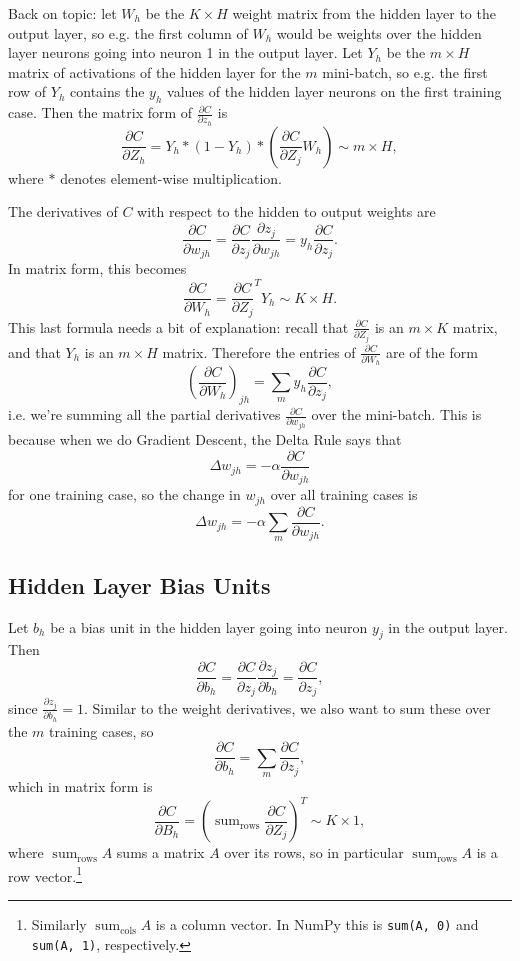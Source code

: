 \documentclass[12pt]{article}
\theoremstyle{plain}
\theoremstyle{definition}
\theoremstyle{remark}
\DeclareMathOperator*{\sumtext}{sum}
\begin{document}
Back on topic: let $W_h$ be the $K \times H$ weight matrix from the hidden layer to the output layer, so e.g. the first column of $W_h$ would be weights over the hidden layer neurons going into neuron 1 in the output layer. Let $Y_h$ be the $m\times H$ matrix of activations of the hidden layer for the $m$ mini-batch, so e.g. the first row of $Y_h$ contains the $y_h$ values of the hidden layer neurons on the first training case. Then the matrix form of $\frac{\partial C}{\partial z_h}$ is
$$\frac{\partial C}{\partial Z_h} = Y_h * (1 - Y_h) * \left(\frac{\partial C}{\partial Z_j}W_h\right) \sim m \times H,$$
where $*$ denotes element-wise multiplication.

The derivatives of $C$ with respect to the hidden to output weights are
$$\frac{\partial C}{\partial w_{jh}} = \frac{\partial C}{\partial z_j} \frac{\partial z_j}{\partial w_{jh}} = y_h \frac{\partial C}{\partial z_j}.$$
In matrix form, this becomes
$$\frac{\partial C}{\partial W_h} = \frac{\partial C}{\partial Z_j}^T Y_h \sim K \times H.$$
This last formula needs a bit of explanation: recall that $\frac{\partial C}{\partial Z_j}$ is an $m\times K$ matrix, and that $Y_h$ is an $m\times H$ matrix. Therefore the entries of $\frac{\partial C}{\partial W_h}$ are of the form 
$$\left(\frac{\partial C}{\partial W_h}\right)_{jh} = \sum_m y_h \frac{\partial C}{\partial z_j},$$
i.e. we're summing all the partial derivatives $\frac{\partial C}{\partial w_{jh}}$ over the mini-batch. This is because when we do Gradient Descent, the Delta Rule says that
$$\Delta w_{jh} = - \alpha \frac{\partial C}{\partial w_{jh}}$$
for one training case, so the change in $w_{jh}$ over all training cases is
$$\Delta w_{jh} = - \alpha \sum_m \frac{\partial C}{\partial w_{jh}}.$$

\subsection{Hidden Layer Bias Units}

Let $b_h$ be a bias unit in the hidden layer going into neuron $y_j$ in the output layer. Then 
$$\frac{\partial C}{\partial b_h} = \frac{\partial C}{\partial z_j} \frac{\partial z_j}{\partial b_h} = \frac{\partial C}{\partial z_j},$$
since $\frac{\partial z_j}{\partial b_h} = 1.$ Similar to the weight derivatives, we also want to sum these over the $m$ training cases, so
$$\frac{\partial C}{\partial b_h} = \sum_m \frac{\partial C}{\partial z_j},$$ which in matrix form is
$$\frac{\partial C}{\partial B_h} = \left(\sumtext_\text{rows}\frac{\partial C}{\partial Z_j}\right)^T \sim K \times 1,$$
where $\sumtext_\text{rows} A$ sums a matrix $A$ over its rows, so in particular $\sumtext_\text{rows} A$ is a row vector.\footnote{Similarly $\sumtext_\text{cols} A$ is a column vector. In NumPy this is \lstinline|sum(A, 0)| and \lstinline|sum(A, 1)|, respectively.}
\end{document}

